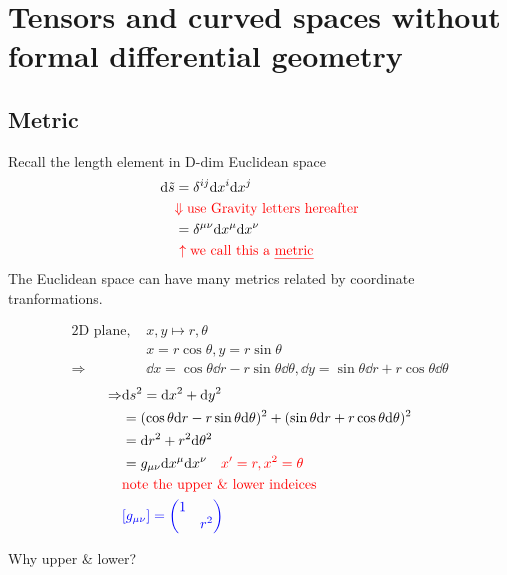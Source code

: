 \documentclass[11pt,fleqn]{book} %
\begin{document}
\chapter{Tensors and curved spaces \normalsize{without formal differential geometry}}

\section{Metric}
Recall the length element in D-dim Euclidean space \\
\begin{align*}
  \dd \tilde{s} &= \delta^{ij} \dd x^i \dd x^j \\
                       & \textcolor{red}{\Downarrow \text{use Gravity letters hereafter}} \\
                       &= \delta^{\mu \nu} \dd x^\mu \dd x^\nu \\
                       &\ \textcolor{red}{\uparrow \text{we call this a \uline{metric}}} \\
\end{align*}
The Euclidean space can have many metrics related by coordinate
tranformations.\\
\begin{example}
  \begin{align*}
    \text{2D plane,\ } & x,y \mapsto r,\theta \\
                       & x = r \cos \theta, y = r \sin \theta \\
    \Rightarrow & \dd x = \cos \theta \dd r - r \sin \theta \dd \theta, \dd y = \sin \theta \dd r + r \cos \theta \dd \theta
  \end{align*}
  \begin{align*}
    \Rightarrow & \dd s^2 = \dd x^2 + \dd y^2 \\
                & = (\cos \theta \dd r - r \sin \theta \dd \theta)^2 + (\sin \theta \dd r + r \cos \theta \dd \theta)^2 \\
                & = \dd r^2 + r^2 \dd \theta^2 \\
                & = g_{\mu\nu} \dd x^\mu \dd x^\nu  \quad \textcolor{red}{x' = r, x^2 = \theta}\\
                & \textcolor{red}{\text{note the upper \& lower indeices}} \\
                & \textcolor{blue}{\left[ g_{\mu\nu} \right] = \mqty(\dmat{1,r^2})}
  \end{align*}
\end{example}
Why upper \& lower? \\
\end{document}
